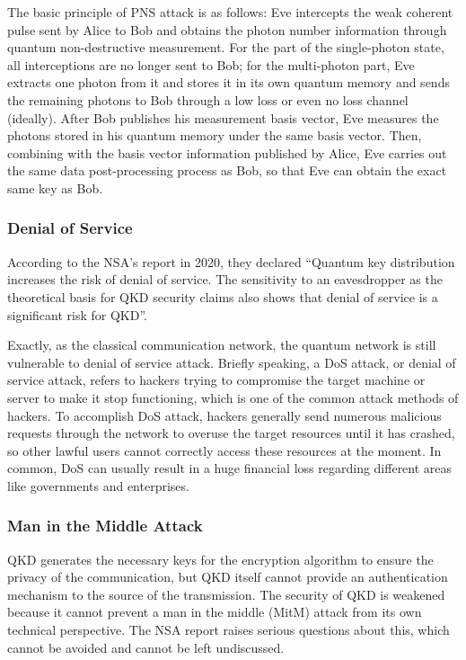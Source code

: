 \documentclass[sigconf]{acmart}
\begin{document}
The basic principle of PNS attack is as follows: Eve intercepts the weak coherent pulse sent by Alice to Bob and obtains the photon number information through quantum non-destructive measurement. For the part of the single-photon state, all interceptions are no longer sent to Bob; for the multi-photon part, Eve extracts one photon from it and stores it in its own quantum memory and sends the remaining photons to Bob through a low loss or even no loss channel (ideally). After Bob publishes his measurement basis vector, Eve measures the photons stored in his quantum memory under the same basis vector. Then, combining with the basis vector information published by Alice, Eve carries out the same data post-processing process as Bob, so that Eve can obtain the exact same key as Bob\cite{brassard_limitations_2000}.

\subsubsection{Denial of Service}
According to the NSA's report in 2020, they declared “Quantum key distribution increases the risk of denial of service. The sensitivity to an eavesdropper as the theoretical basis for QKD security claims also shows that denial of service is a significant risk for QKD”\cite{national_security_agency_nsa_quantum_nodate}.

Exactly, as the classical communication network, the quantum network is still vulnerable to denial of service attack. Briefly speaking, a DoS attack, or denial of service attack, refers to hackers trying to compromise the target machine or server to make it stop functioning, which is one of the common attack methods of hackers. To accomplish DoS attack, hackers generally send numerous malicious requests through the network to overuse the target resources until it has crashed, so other lawful users cannot correctly access these resources at the moment. In common, DoS can usually result in a huge financial loss regarding different areas like governments and enterprises\cite{noauthor_what_nodate}.

\subsubsection{Man in the Middle Attack}
QKD generates the necessary keys for the encryption algorithm to ensure the privacy of the communication, but QKD itself cannot provide an authentication mechanism to the source of the transmission. The security of QKD is weakened because it cannot prevent a man in the middle (MitM) attack from its own technical perspective. The NSA report raises serious questions about this, which cannot be avoided and cannot be left undiscussed\cite{national_security_agency_nsa_quantum_nodate}.
\end{document}
